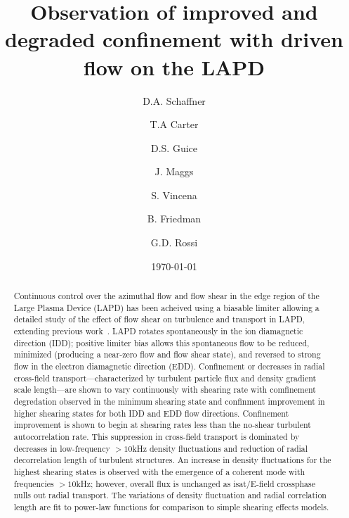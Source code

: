 \documentclass[%
 aps,
 prl,
 amsmath,amssymb,
 reprint,%
]{revtex4-1}
\begin{document}
\title{Observation of improved and degraded confinement with driven flow on the LAPD}
\author{D.A. Schaffner}
\author{T.A Carter}
\author{D.S. Guice}
\author{J. Maggs}
\author{S. Vincena}
\author{B. Friedman}
\author{G.D. Rossi}

\date{\today}%

\begin{abstract}
Continuous control over the azimuthal flow and flow shear in the edge region of the Large Plasma Device (LAPD) has been acheived using a biasable limiter allowing a detailed study of the effect of flow shear on turbulence and transport in LAPD, extending previous work~\cite{carter09}. LAPD rotates spontaneously in the ion diamagnetic direction (IDD); positive limiter bias allows this spontaneous flow to be reduced, minimized (producing a near-zero flow and flow
shear state), and reversed to strong flow in the electron diamagnetic direction (EDD). Confinement or decreases in radial cross-field transport---characterized by turbulent particle flux and density gradient scale length---are shown to vary continuously with shearing rate with comfinement degredation observed in the minimum shearing state and confinment improvement in higher shearing states for both IDD and EDD flow directions. Confinement improvement is shown to begin at shearing rates less than the no-shear turbulent autocorrelation rate. This suppression in cross-field transport is dominated by decreases in low-frequency $>10$kHz density fluctuations and reduction of radial decorrelation length of turbulent structures. An increase in density fluctuations for the highest shearing states is observed with the emergence of a coherent mode with frequencies $>10$kHz; however, overall flux is unchanged as isat/E-field crossphase nulls out radial transport. The variations of density fluctuation and radial correlation length are fit to power-law functions for comparison to simple shearing effects models.
\end{abstract}
\end{document}
